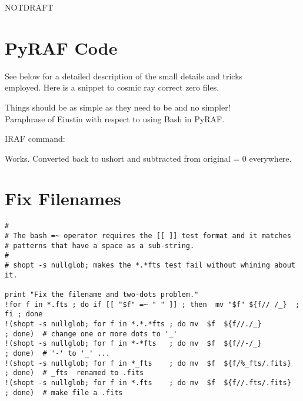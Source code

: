 \documentclass[letter,11pt,oneside]{article}
\def\documentisdraft{NOTDRAFT}
\begin{document}

\setcounter{section}{0}

\ifx\documentisdraft\drafttest
\linenumbers    %
\fi



\begin{landscape}
\section*{PyRAF Code} \label{sec:pyrafcode}

See below for a detailed description of the small details and tricks \\
employed. Here is a snippet to cosmic ray correct zero files.

Things should be as simple as they need to be and no simpler!\\
Paraphrase of Einstin with respect to using Bash in PyRAF.

IRAF {\color{verbcolor}{\verb#chpixtype#}} command:

{\color{verbcolor}{\verb#chpixtype myushort.fits myreal.fits real#}}

Works. Converted back to ushort and subtracted from original = 0 everywhere.


\section*{Fix Filenames}

\begingroup \fontsize{10pt}{10pt}
\selectfont
\begin{verbatim} 
#
# The bash =~ operator requires the [[ ]] test format and it matches
# patterns that have a space as a sub-string.
#
# shopt -s nullglob; makes the *.*fts test fail without whining about it.

print "Fix the filename and two-dots problem."
!for f in *.fts ; do if [[ "$f" =~ " " ]] ; then  mv "$f" ${f// /_}  ; fi ; done 
!(shopt -s nullglob; for f in *.*.*fts ; do mv  $f  ${f//./_}             ; done)  # change one or more dots to '_'
!(shopt -s nullglob; for f in *-*fts   ; do mv  $f  ${f//-/_}             ; done)  # '-' to '_' ...
!(shopt -s nullglob; for f in *_fts    ; do mv  $f  ${f/%_fts/.fits}      ; done)  # _fts  renamed to .fits
!(shopt -s nullglob; for f in *.fts    ; do mv  $f  ${f//.fts/.fits}      ; done)  # make file a .fits
\end{verbatim}                                                            
\endgroup



\end{landscape}
\end{document}
